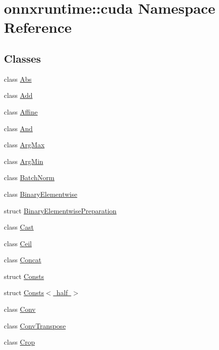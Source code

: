 \hypertarget{namespaceonnxruntime_1_1cuda}{}\section{onnxruntime\+:\+:cuda Namespace Reference}
\label{namespaceonnxruntime_1_1cuda}
\subsection*{Classes}
\begin{DoxyCompactItemize}
\item 
class \mbox{\hyperlink{classonnxruntime_1_1cuda_1_1Abs}{Abs}}
\item 
class \mbox{\hyperlink{classonnxruntime_1_1cuda_1_1Add}{Add}}
\item 
class \mbox{\hyperlink{classonnxruntime_1_1cuda_1_1Affine}{Affine}}
\item 
class \mbox{\hyperlink{classonnxruntime_1_1cuda_1_1And}{And}}
\item 
class \mbox{\hyperlink{classonnxruntime_1_1cuda_1_1ArgMax}{Arg\+Max}}
\item 
class \mbox{\hyperlink{classonnxruntime_1_1cuda_1_1ArgMin}{Arg\+Min}}
\item 
class \mbox{\hyperlink{classonnxruntime_1_1cuda_1_1BatchNorm}{Batch\+Norm}}
\item 
class \mbox{\hyperlink{classonnxruntime_1_1cuda_1_1BinaryElementwise}{Binary\+Elementwise}}
\item 
struct \mbox{\hyperlink{structonnxruntime_1_1cuda_1_1BinaryElementwisePreparation}{Binary\+Elementwise\+Preparation}}
\item 
class \mbox{\hyperlink{classonnxruntime_1_1cuda_1_1Cast}{Cast}}
\item 
class \mbox{\hyperlink{classonnxruntime_1_1cuda_1_1Ceil}{Ceil}}
\item 
class \mbox{\hyperlink{classonnxruntime_1_1cuda_1_1Concat}{Concat}}
\item 
struct \mbox{\hyperlink{structonnxruntime_1_1cuda_1_1Consts}{Consts}}
\item 
struct \mbox{\hyperlink{structonnxruntime_1_1cuda_1_1Consts_3_01half_01_4}{Consts$<$ half $>$}}
\item 
class \mbox{\hyperlink{classonnxruntime_1_1cuda_1_1Conv}{Conv}}
\item 
class \mbox{\hyperlink{classonnxruntime_1_1cuda_1_1ConvTranspose}{Conv\+Transpose}}
\item 
class \mbox{\hyperlink{classonnxruntime_1_1cuda_1_1Crop}{Crop}}

\end{DoxyCompactItemize}
